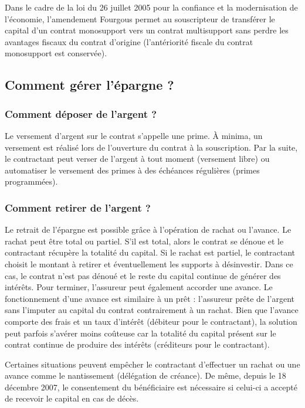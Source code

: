 \documentclass{article}
\newcommand{\blackFrame}[2]{
    \begin{tcolorbox}[colback=white,colframe=black!100!white,title={#1}]
        #2
    \end{tcolorbox}
}
\begin{document}

\blackFrame{Amendement Fourgous}{
Dans le cadre de la loi du 26 juillet 2005 pour la confiance et la modernisation de l'économie, l'amendement Fourgous permet au souscripteur de transférer le capital d'un contrat monosupport vers un contrat multisupport sans perdre les avantages fiscaux du contrat d'origine (l'antériorité fiscale du contrat monosupport est conservée).
}

\subsection{Comment gérer l'épargne ?}
\subsubsection{Comment déposer de l'argent ?}
Le versement d'argent sur le contrat s'appelle une prime. À minima, un versement est réalisé lors de l'ouverture du contrat à la souscription. Par la suite, le contractant peut verser de l'argent à tout moment (versement libre) ou automatiser le versement des primes à des échéances régulières (primes programmées).

\subsubsection{Comment retirer de l'argent ?}
Le retrait de l'épargne est possible grâce à l'opération de rachat ou l'avance. Le rachat peut être total ou partiel. S'il est total, alors le contrat se dénoue et le contractant récupère la totalité du capital. Si le rachat est partiel, le contractant choisit le montant à retirer et éventuellement les supports à désinvestir. Dans ce cas, le contrat n'est pas dénoué et le reste du capital continue de générer des intérêts. Pour terminer, l'assureur peut également accorder une avance. Le fonctionnement d'une avance est similaire à un prêt : l'assureur prête de l'argent sans l'imputer au capital du contrat contrairement à un rachat. Bien que l'avance comporte des frais et un taux d'intérêt (débiteur pour le contractant), la solution peut parfois s'avérer moins coûteuse car la totalité du capital présent sur le contrat continue de produire des intérêts (créditeurs pour le contractant).

\blackFrame{Cas particuliers}{
    Certaines situations peuvent empêcher le contractant d'effectuer un rachat ou une avance comme le nantissement (délégation de créance). De même, depuis le 18 décembre 2007, le consentement du bénéficiaire est nécessaire si celui-ci a accepté de recevoir le capital en cas de décès.
}
\end{document}

